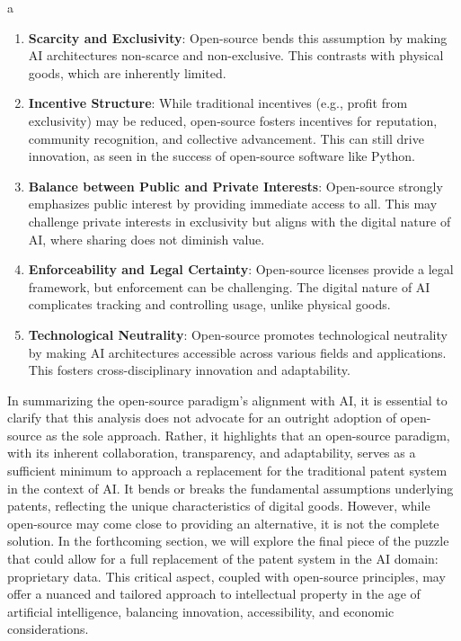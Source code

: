 a\documentclass{article}[10pt]
\begin{document}
\begin{enumerate}
	\item \textbf{Scarcity and Exclusivity}: Open-source bends this assumption by making AI architectures non-scarce and non-exclusive. This contrasts with physical goods, which are inherently limited.
	\item \textbf{Incentive Structure}: While traditional incentives (e.g., profit from exclusivity) may be reduced, open-source fosters incentives for reputation, community recognition, and collective advancement. This can still drive innovation, as seen in the success of open-source software like Python.
	\item \textbf{Balance between Public and Private Interests}: Open-source strongly emphasizes public interest by providing immediate access to all. This may challenge private interests in exclusivity but aligns with the digital nature of AI, where sharing does not diminish value.
	\item \textbf{Enforceability and Legal Certainty}: Open-source licenses provide a legal framework, but enforcement can be challenging. The digital nature of AI complicates tracking and controlling usage, unlike physical goods.
	\item \textbf{Technological Neutrality}: Open-source promotes technological neutrality by making AI architectures accessible across various fields and applications. This fosters cross-disciplinary innovation and adaptability.
\end{enumerate}

In summarizing the open-source paradigm's alignment with AI, it is essential to clarify that this analysis does not advocate for an outright adoption of open-source as the sole approach. Rather, it highlights that an open-source paradigm, with its inherent collaboration, transparency, and adaptability, serves as a sufficient minimum to approach a replacement for the traditional patent system in the context of AI. It bends or breaks the fundamental assumptions underlying patents, reflecting the unique characteristics of digital goods. However, while open-source may come close to providing an alternative, it is not the complete solution. In the forthcoming section, we will explore the final piece of the puzzle that could allow for a full replacement of the patent system in the AI domain: proprietary data. This critical aspect, coupled with open-source principles, may offer a nuanced and tailored approach to intellectual property in the age of artificial intelligence, balancing innovation, accessibility, and economic considerations.
\end{document}
